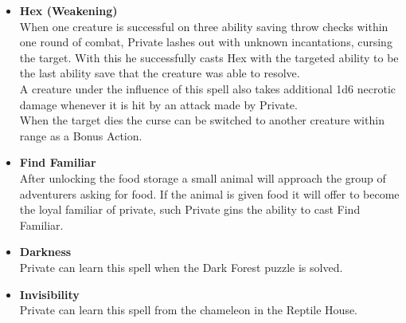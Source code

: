 \begin{itemize}
\begin{itemize}
		\item \textcolor{titlered}{\textbf{Hex (Weakening)}}\\
		When one creature is successful on three ability saving throw checks within one round of combat, Private lashes out with unknown incantations, cursing the target. With this he successfully casts Hex with the targeted ability to be the last ability save that the creature was able to resolve.\\
		A creature under the influence of this spell also takes additional 1d6 necrotic damage whenever it is hit by an attack made by Private.\\
		When the target dies the curse can be switched to another creature within range as a Bonus Action.
		\item \textcolor{titlered}{\textbf{Find Familiar}}\\
		After unlocking the food storage a small animal will approach the group of adventurers asking for food. If the animal is given food it will offer to become the loyal familiar of private, such Private gins the ability to cast Find Familiar.
		\item \textcolor{titlered}{\textbf{Darkness}}\\
		Private can learn this spell when the Dark Forest puzzle is solved.
		\item \textcolor{titlered}{\textbf{Invisibility}}\\
		Private can learn this spell from the chameleon in the Reptile House.
	\end{itemize}
\end{itemize}
\clearpage%
%
%
\clearpage%
%
%
\clearpage%
%
%
\clearpage%
%
%
\clearpage%
%
%
